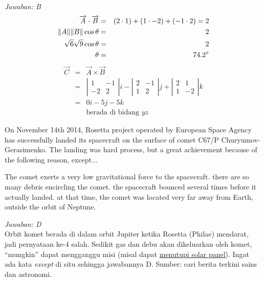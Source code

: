 \documentclass[11pt,fleqn]{exam}
\begin{document}
\begin{questions}
{\textit{Jawaban: B}
\begin{eqnarray*}
\overrightarrow{A} \cdot \overrightarrow{B} &=& (2 \cdot 1) + (1 \cdot -2) + (-1 \cdot 2) = 2\\
\Vert A \Vert \Vert B \Vert \cos \theta &=& 2\\
\sqrt{6} \sqrt{9} \cos \theta &=& 2\\
\theta &=& 74.2\degree 
\end{eqnarray*}
\begin{eqnarray*}
\overrightarrow{C} &=& \overrightarrow{A} \times \overrightarrow{B} \\
&=& 
\left|
\begin{matrix}
1 & -1 \\
-2 & 2 
\end{matrix}
\right| i - 
\left| 
\begin{matrix}
2 & -1 \\
1 & 2 
\end{matrix} \right| j +
\left|
\begin{matrix}
2 & 1 \\
1 & -2 
\end{matrix}
\right| k\\
&=& 0 i - 5 j - 5 k \\
&& \text{berada di bidang $yz$}
\end{eqnarray*}


\question On November 14th 2014, Rosetta project operated by European Space Agency has successfully landed its spacecraft on the surface of comet C67/P Churyumov-Gerasimenko. The landing was hard process, but a great achievement because of the following reason, except...
\begin{choices}
\choice The comet exerts a very low gravitational force to the spacecraft.
\choice there are so many debris encircling the comet.
\choice the spacecraft bounced several times before it actually landed.
\choice at that time, the comet was located very far away from Earth, outside the orbit of Neptune.
\end{choices}

\textit{Jawaban: D}\\
Orbit komet berada di dalam orbit Jupiter ketika Rosetta (Philae) mendarat, jadi pernyataan ke-4 salah. Sedikit gas dan debu akan dikeluarkan oleh komet, ``mungkin'' dapat mengganggu misi (misal dapat \href{http://www.esa.int/Our_Activities/Space_Science/Rosetta/Frequently_asked_questions}{menutupi solar panel}). Ingat ada kata \textit{except} di situ sehingga jawabannya D. Sumber: cari berita terkini sains dan astronomi.\\
}%



\end{questions}
\end{document}
